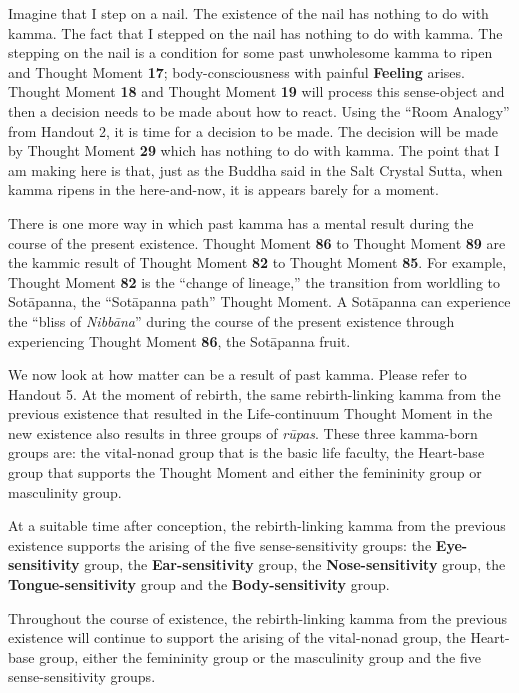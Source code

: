 Imagine that I step on a nail. The existence of the nail has nothing to do with kamma. The fact that I stepped on the nail has nothing to do with kamma. The stepping on the nail is a condition for some past unwholesome kamma to ripen and Thought Moment \textbf{17}; body-consciousness with painful \textbf{Feeling} arises. Thought Moment \textbf{18} and Thought Moment \textbf{19} will process this sense-object and then a decision needs to be made about how to react. Using the “Room Analogy” from Handout 2, it is time for a decision to be made. The decision will be made by Thought Moment \textbf{29} which has nothing to do with kamma. The point that I am making here is that, just as the Buddha said in the Salt Crystal Sutta, when kamma ripens in the here-and-now, it is appears barely for a moment.

There is one more way in which past kamma has a mental result during the course of the present existence. Thought Moment \textbf{86} to Thought Moment \textbf{89} are the kammic result of Thought Moment \textbf{82} to Thought Moment \textbf{85}. For example, Thought Moment \textbf{82} is the “change of lineage,” the transition from worldling to Sotāpanna, the “Sotāpanna path” Thought Moment. A Sotāpanna can experience the “bliss of \textit{Nibbāna}” during the course of the present existence through experiencing Thought Moment \textbf{86}, the Sotāpanna fruit.

We now look at how matter can be a result of past kamma. Please refer to Handout 5. At the moment of rebirth, the same rebirth-linking kamma from the previous existence that resulted in the Life-continuum Thought Moment in the new existence also results in three groups of \textit{rūpas}. These three kamma-born groups are: the vital-nonad group that is the basic life faculty, the Heart-base group that supports the Thought Moment and either the femininity group or masculinity group.

At a suitable time after conception, the rebirth-linking kamma from the previous existence supports the arising of the five sense-sensitivity groups: the \textbf{Eye-sensitivity} group, the \textbf{Ear-sensitivity} group, the \textbf{Nose-sensitivity} group, the \textbf{Tongue-sensitivity} group and the \textbf{Body-sensitivity} group.

Throughout the course of existence, the rebirth-linking kamma from the previous existence will continue to support the arising of the vital-nonad group, the Heart-base group, either the femininity group or the masculinity group and the five sense-sensitivity groups.

